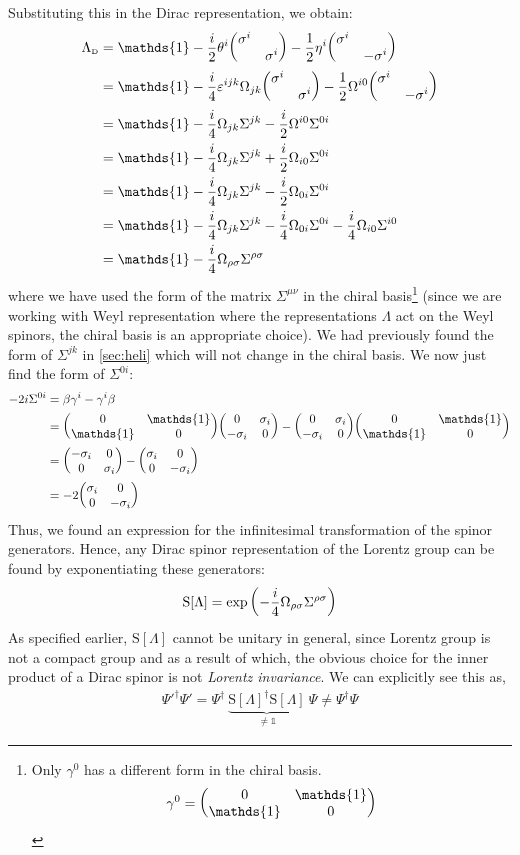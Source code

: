 Substituting this in the Dirac representation, we obtain:
\begin{align*}
  \Lambda_{\text{\tiny D}} &= \mathds{1} -\frac{i}{2}\theta^i \mqty(\sigma^i & \\ & \sigma^i) -\frac{1}{2}\eta^i\mqty(\sigma^i & \\ & -\sigma^i)\\
  &=\mathds{1} -\frac{i}{4}\vep^{ijk}\Omega_{jk} \mqty(\sigma^i & \\ & \sigma^i) -\frac{1}{2}\Omega^{i0}\mqty(\sigma^i & \\ & -\sigma^i)\\
  &=\mathds{1} -\frac{i}{4}\Omega_{jk} \Sigma^{jk}-\frac{i}{2}\Omega^{i0}\Sigma^{0i}\\
  &=\mathds{1} -\frac{i}{4}\Omega_{jk} \Sigma^{jk}+\frac{i}{2}\Omega_{i0}\Sigma^{0i}\\
  &=\mathds{1} -\frac{i}{4}\Omega_{jk} \Sigma^{jk}-\frac{i}{2}\Omega_{0i}\Sigma^{0i}\\
  &=\mathds{1} -\frac{i}{4}\Omega_{jk} \Sigma^{jk}-\frac{i}{4}\Omega_{0i}\Sigma^{0i}-\frac{i}{4}\Omega_{i0}\Sigma^{i0}\\
  &=\mathds{1} - \frac{i}{4}\Omega_{\rho\sigma}\Sigma^{\rho\sigma}
\end{align*}
where we have used the form of the matrix $\Sigma^{\mu\nu}$ in the chiral basis\footnote{Only $\gamma^0$ has a different form in the chiral basis.$$\gamma^0 = \mqty(0 & \mathds{1}\\ \mathds{1} & 0)$$} (since we are working with Weyl representation where the representations $\Lambda$ act on the Weyl spinors, the chiral basis is an appropriate choice). We had previously found the form of $\Sigma^{jk}$ in \ref{sec:heli} which will not change in the chiral basis. We now just find the form of $\Sigma^{0i}$:
\begin{align*}
   -2i \Sigma^{0i} &= \beta \gamma^i - \gamma^i \beta\\
    &=\mqty(0 & \mathds{1}\\ \mathds{1}&0) \gami{i} - \gami{i} \mqty(0 & \mathds{1}\\  \mathds{1} &0)\\
    &=  \mqty(-\sigma_i & 0\\0 &\sigma_i) - \mqty(\sigma_i & 0\\0 &-\sigma_i)\\
    &=-2 \mqty(\sigma_i & 0\\0 &-\sigma_i)
\end{align*}
Thus, we found an expression for the infinitesimal transformation of the spinor generators. Hence, any Dirac spinor representation of the Lorentz group can be found by exponentiating these generators:
$$\mathrm{S}[\Lambda ]= \exp \qty(-\frac{i}{4}\Omega_{\rho\sigma}\Sigma^{\rho\sigma})$$
As specified earlier, $\mathrm{S}[\Lambda]$ cannot be unitary in general, since Lorentz group is not a compact group and as a result of which, the obvious choice for the inner product of a Dirac spinor is not \textit{Lorentz invariance}. We can explicitly see this as,
\begin{align*}
  \Psi'^\dagger \Psi' =\Psi^\dagger\ \underbrace{\mathrm{S}[\Lambda]^\dagger   \mathrm{S}[\Lambda] }_{\neq \mathds{1}}\ \Psi \neq \Psi^\dagger \Psi
\end{align*}
